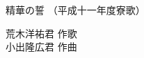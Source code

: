 \documentclass[10pt,b5j]{tarticle} %
\begin{document}
\begin{minipage}[c]{0.7\hsize} %
    \begin{center}
        {\LARGE
            精華の誓 %
        }
        {\small 
            （平成十一年度寮歌） %
        }
    \end{center}
\end{minipage}
\begin{minipage}[c]{0.3\hsize} %
    \begin{flushright} %
        荒木洋祐君 作歌\\小出隆広君 作曲 %
    \end{flushright}
\end{minipage}
\end{document}
